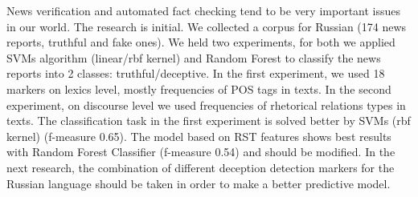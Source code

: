 News verification and automated fact checking tend to be very important issues in our world. The research is initial. We collected a corpus for Russian (174 news reports, truthful and fake ones). We held two experiments, for both we applied SVMs algorithm (linear/rbf kernel) and Random Forest to classify the news reports into 2 classes: truthful/deceptive. In the first experiment, we used 18 markers on lexics level, mostly frequencies of POS tags in texts. In the second experiment, on discourse level we used frequencies of rhetorical relations types in texts. The classification task in the first experiment is solved better by SVMs (rbf kernel) (f-measure 0.65). The model based on RST features shows best results with Random Forest Classifier (f-measure 0.54) and should be modified. In the next research, the combination of different deception detection markers for the Russian language should be taken in order to make a better predictive model.
